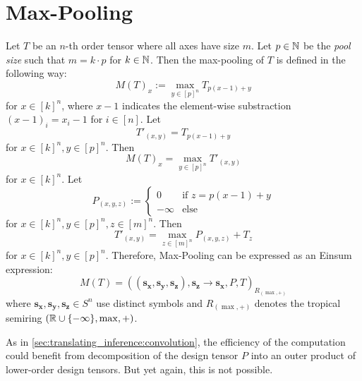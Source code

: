 \section{Max-Pooling}

Let $T$ be an $n$-th order tensor where all axes have size $m$.
Let $p \in \mathbb{N}$ be the \textit{pool size} such that $m = k \cdot p$ for $k \in \mathbb{N}$.
Then the max-pooling of $T$ is defined in the following way:
$$M(T)_{x} := \max\limits_{y \in [p]^n} T_{p (x - 1) + y}$$
for $x \in [k]^n$, where $x - 1$ indicates the element-wise substraction $(x - 1)_i = x_i - 1$ for $i \in [n]$.
Let
$$T'_{(x,y)} = T_{p (x - 1) + y}$$
for $x \in [k]^n, y \in [p]^n$.
Then
$$M(T)_{x} = \max\limits_{y \in [p]^n} T'_{(x,y)}$$
for $x \in [k]^n$. Let
$$P_{(x,y,z)} := \begin{cases}
    0 & \text{if } z = p (x - 1) + y\\
    -\infty & \text{else}
\end{cases}$$
for $x \in [k]^n, y \in [p]^n, z \in [m]^n$.
Then
$$T'_{(x,y)} = \max\limits_{z \in [m]^n} P_{(x,y,z)} + T_{z}$$
for $x \in [k]^n, y \in [p]^n$.
Therefore, Max-Pooling can be expressed as an Einsum expression:
$$M(T) = ((\bm{s_x},\bm{s_y},\bm{s_z}), \bm{s_z}  \rightarrow \bm{s_x}, P, T)_{R_{(\max, +)}}$$
where $\bm{s_x},\bm{s_y},\bm{s_z} \in S^n$ use distinct symbols and $R_{(\max, +)}$ denotes the tropical semiring $(\mathbb{R} \cup \lbrace -\infty \rbrace, \max, +)$.

As in \autoref{sec:translating_inference:convolution}, the efficiency of the computation could benefit from decomposition of the design tensor $P$ into an outer product of lower-order design tensors.
But yet again, this is not possible.

